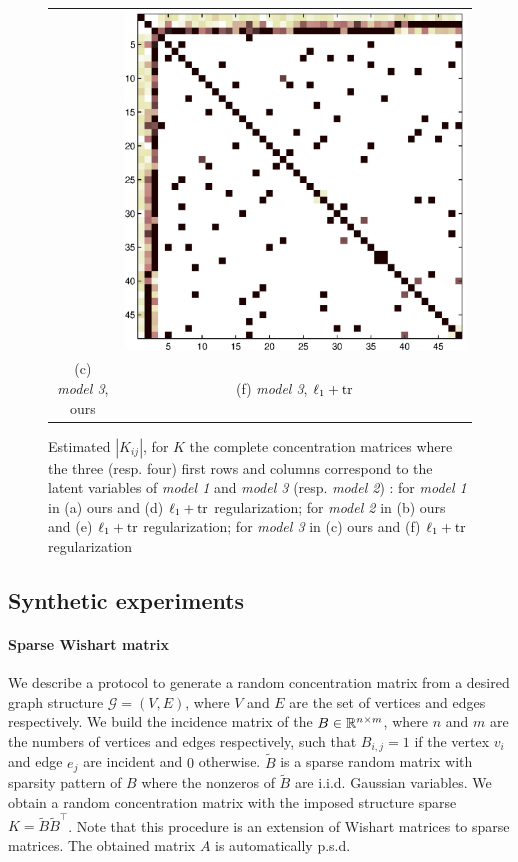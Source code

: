 \documentclass[letterpaper]{article}
\begin{document}
\begin{figure}
\begin{tabular}{cc}
  &   \includegraphics[width=.3\linewidth]{fig/diff_tr}
   \\    (c)  \textit{model 3}, ours & (f)  \textit{model 3}, $\ell_1+{\rm tr}$  \\[6pt]
\end{tabular}
\caption{Estimated $|K_{ij}|$, for $K$ the complete concentration matrices where the three (resp. four) first rows and columns correspond to the latent variables of \textit{model 1} and \textit{model 3} (resp. \textit{model 2}) : for \textit{model 1} in (a) ours and (d) $\ell_1+{\rm tr}$ regularization; for \textit{model 2} in (b) ours and (e) $\ell_1+{\rm tr}$ regularization; for \textit{model 3} in (c) ours and (f) $\ell_1+{\rm tr}$ regularization }
\end{figure}

\subsection{Synthetic experiments}

\paragraph{Sparse Wishart matrix}
We describe a protocol to generate a random concentration matrix from a desired graph structure $\mathcal{G}=(V,E)$, where $V$ and $E$ are the set of vertices and edges respectively. We build the incidence matrix of the $B\in\mathbb{R}^{n\times m}$, where $n$ and $m$ are the numbers of vertices and edges respectively, such that $B_{i,j} = 1$ if the vertex $v_i$ and edge $e_j$ are incident and $0$ otherwise. $\tilde{B}$ is a sparse random matrix with sparsity pattern of $B$ where the nonzeros of $\tilde{B}$ are i.i.d. Gaussian variables. We obtain a random concentration matrix with the imposed structure sparse $K=\tilde{B}\tilde{B}^{\top}$. Note that this procedure is an extension of Wishart matrices to sparse matrices. The obtained matrix $A$ is automatically p.s.d.
\end{document}
